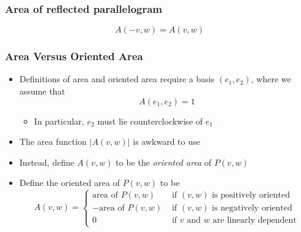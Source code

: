 \documentclass[usenames,dvipsnames,10pt]{beamer}
\begin{document}
\begin{frame}
  \frametitle{Area of reflected parallelogram}

  \begin{center}
  \end{center}

  \[
    A(-v,w) = A(v,w)
  \]

\end{frame}

\begin{frame}
  \frametitle{Area Versus Oriented Area}

  \begin{itemize}
  \item Definitions of area and oriented area require a basis $(e_1,e_2)$, where we assume that
    \[
      A(e_1,e_2) = 1
    \]
    \begin{itemize}
    \item In particular, $e_2$ must lie counterclockwise of $e_1$
    \end{itemize}
  \item The area function $|A(v,w)|$ is awkward to use
  \item Instead, define $A(v,w)$ to be the {\em oriented area} of $P(v,w)$
  \item Define the oriented area of $P(v,w)$ to be
    \[
      A(v,w) =
      \begin{cases}
        \text{area of }P(v,w) &\text{ if }(v,w)\text{ is positively oriented}\\
        -\text{area of }P(v,w) &\text{ if }(v,w)\text{ is negatively oriented}\\
        0 &\text{ if }v\text{ and }w\text{ are linearly dependent}
      \end{cases}
    \]
  \end{itemize}
\end{frame}
\end{document}

